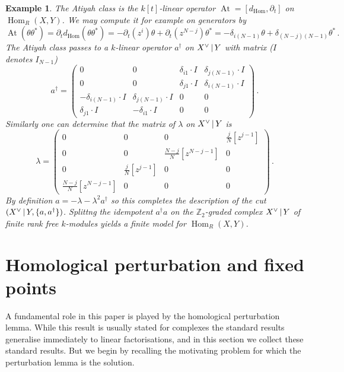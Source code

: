 \documentclass[english,letter paper,12pt,leqno]{article}
\theoremstyle{example}
\newtheorem{example}[theorem]{Example}
\numberwithin{equation}{section}
\def\Hom{\operatorname{Hom}}
\DeclareMathOperator{\At}{At}
\begin{document}
\begin{example}
The Atiyah class is the $k[t]$-linear operator $\At = [d_{\Hom}, \partial_t]$ on $\Hom_R(X,Y)$. We may compute it for example on generators by
\[
\At( \theta \theta^* ) = \partial_t d_{\Hom}( \theta \theta^* ) = - \partial_t( z^i ) \theta + \partial_t( z^{N-j} ) \theta^* = - \delta_{i (N-1)} \theta + \delta_{(N-j)(N-1)} \theta^*\,.
\]
The Atiyah class passes to a $k$-linear operator $a^\dagger$ on $X^{\vee} \,|\, Y$ with matrix ($I$ denotes $I_{N-1}$)
\begin{equation}\label{eq:aityah_class_hom_example}
a^\dagger = \begin{pmatrix} 0 & 0 & \delta_{i1} \cdot I & \delta_{j(N-1)} \cdot I \\ 
0 & 0 & \delta_{j1} \cdot I & \delta_{i(N-1)} \cdot I \\
- \delta_{i(N-1)} \cdot I & \delta_{j(N-1)} \cdot I & 0 & 0 \\
\delta_{j1} \cdot I & - \delta_{i1} \cdot I & 0 & 0 \end{pmatrix}\,.
\end{equation}
Similarly one can determine that the matrix of $\lambda$ on $X^{\vee} \,|\, Y$ is
\[
\lambda = \begin{pmatrix} 0 & 0 & 0 & \frac{j}{N} [z^{j-1}] \\
0 & 0 & \frac{N-j}{N} [z^{N-j-1}] & 0\\
0 & \frac{j}{N} [z^{j-1}] & 0 & 0\\
\frac{N-j}{N} [z^{N-j-1}] & 0 & 0 & 0\end{pmatrix}\,.
\]
By definition $a = - \lambda - \lambda^2 a^\dagger$ so this completes the description of the cut $( X^{\vee} \,|\, Y, \{ a, a^\dagger \} )$. Splittng the idempotent $a^\dagger a$ on the $\mathbb{Z}_2$-graded complex $X^{\vee} \,|\, Y$ of finite rank free $k$-modules yields a finite model for $\Hom_R(X,Y)$.
\end{example}

\appendix

\section{Homological perturbation and fixed points}\label{section:homolog_fix}

A fundamental role in this paper is played by the homological perturbation lemma. While this result is usually stated for complexes the standard results generalise immediately to linear factorisations, and in this section we collect these standard results. But we begin by recalling the motivating problem for which the perturbation lemma is the solution.
\end{document}
